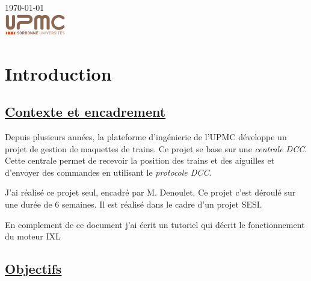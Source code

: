 \begin{titlepage}
{\large \today}\\[2cm] %


\includegraphics[width=0.2\textwidth]{logo.png}


\vfill %

\end{titlepage}




\section{Introduction}
\label{sec:introduction}

\subsection{\underline{Contexte et encadrement}}

Depuis plusieurs ann\'ees, la plateforme d'ingénierie de l'UPMC d\'eveloppe un projet de
gestion de maquettes de trains. Ce projet se base sur une
\emph{centrale DCC}. Cette centrale permet de recevoir la position des
trains et des aiguilles et d'envoyer des commandes en utilisant le
\emph{protocole DCC}.

J'ai r\'ealis\'e ce projet seul, encadr\'e par M. Denoulet. Ce projet c'est d\'eroulé sur une dur\'ee de 6 semaines.
Il est r\'ealis\'e dans le cadre d'un projet SESI.

En complement de ce document j'ai écrit un tutoriel \cite{interface}
qui décrit le fonctionnement du moteur IXL

\subsection{\underline{Objectifs}}

